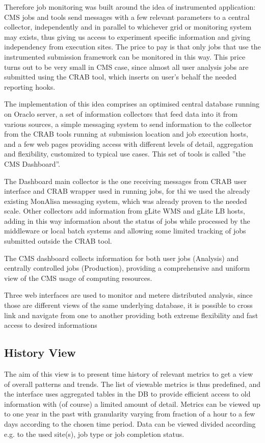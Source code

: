 Therefore job monitoring was built around the idea of instrumented
application: CMS jobs and tools send messages with a few relevant
parameters to a central collector, independently and in parallel to
whichever grid or monitoring system may exists, thus giving us
access to experiment specific information and giving independency
from execution sites. The price to pay is that only jobs that use the
instrumented submission framework can be monitored in this way.
This price turns out to be very small in CMS case, since almost
all user analysis jobs are submitted using the CRAB tool, which
inserts on user's behalf the needed reporting hooks.

The implementation of this idea comprises an optimised central
database running on Oraclo server, a set of information collectors
that feed data into it from various sources, a simple messaging
system to send information to the collector from the
CRAB tools running at submission location and job execution hosts,
and a few web pages providing access with different levels
of detail, aggregation and flexibility, customized to
typical use cases. This set of tools is called ''the CMS Dashboard''.

The Dashboard main collector is the one receiving messages from
CRAB user interface and CRAB wrapper used in running jobs, for thi
we used the already existing MonAlisa messaging system, which was
already proven to the needed scale. Other collectors add
information from gLite WMS and gLite LB hosts, adding in this way
information about the status of jobs while processed by the
middleware or local batch systems and allowing some limited
tracking of jobs submitted outside the CRAB tool.

The CMS dashboard collects information for both user jobs
(Analysis) and centrally controlled jobs (Production), providing
a comprehensive and uniform view of the CMS usage of computing
resources.

Three web interfaces are used to monitor and metere distributed analysis,
since those are different views of the same underlying database,
it is possible to cross link and navigate from one to another
providing both extreme flexibility and fast access to desired
informations

\subsection{History View}
The aim of this view is to present time history of relevant
metrics to get a view of overall patterns and trends.
The list of viewable metrics is thus predefined, and
the interface uses aggregated tables in the DB to provide
efficient access to old information with (of course) a limited
amount of detail. Metrics can be viewed up to one year in the past
with granularity varying from fraction of a hour to a few days
according to the chosen time period. Data can be viewed divided
according e.g. to the used site(s), job type or job completion status.


